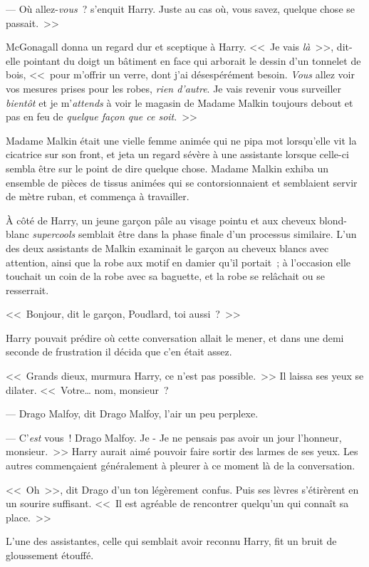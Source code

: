 --- Où allez-\emph{vous}~? s'enquit Harry. Juste au cas où, vous savez, quelque chose se passait.~>>

McGonagall donna un regard dur et sceptique à Harry. <<~Je vais \emph{là}~>>, dit-elle pointant du doigt un bâtiment en face qui arborait le dessin d'un tonnelet de bois, <<~pour m'offrir un verre, dont j'ai désespérément besoin. \emph{Vous} allez voir vos mesures prises pour les robes, \emph{rien d'autre}. Je vais revenir vous surveiller \emph{bientôt} et je m'\emph{attends} à voir le magasin de Madame Malkin toujours debout et pas en feu de \emph{quelque façon que ce soit}.~>>

Madame Malkin était une vielle femme animée qui ne pipa mot lorsqu'elle vit la cicatrice sur son front, et jeta un regard sévère à une assistante lorsque celle-ci sembla être sur le point de dire quelque chose. Madame Malkin exhiba un ensemble de pièces de tissus animées qui se contorsionnaient et semblaient servir de mètre ruban, et commença à travailler.

À côté de Harry, un jeune garçon pâle au visage pointu et aux cheveux blond-blanc \emph{supercools} semblait être dans la phase finale d'un processus similaire. L'un des deux assistants de Malkin examinait le garçon au cheveux blancs avec attention, ainsi que la robe aux motif en damier qu'il portait~; à l'occasion elle touchait un coin de la robe avec sa baguette, et la robe se relâchait ou se resserrait.

<<~Bonjour, dit le garçon, Poudlard, toi aussi~?~>>

Harry pouvait prédire où cette conversation allait le mener, et dans une demi seconde de frustration il décida que c'en était assez.

<<~Grands dieux, murmura Harry, ce n'est pas possible.~>> Il laissa ses yeux se dilater. <<~Votre… nom, monsieur~?

--- Drago Malfoy, dit Drago Malfoy, l'air un peu perplexe.

--- C'\emph{est} vous~! Drago Malfoy. Je - Je ne pensais pas avoir un jour l'honneur, monsieur.~>> Harry aurait aimé pouvoir faire sortir des larmes de ses yeux. Les autres commençaient généralement à pleurer à ce moment là de la conversation.

<<~Oh~>>, dit Drago d'un ton légèrement confus. Puis ses lèvres s'étirèrent en un sourire suffisant. <<~Il est agréable de rencontrer quelqu'un qui connaît sa place.~>>

L'une des assistantes, celle qui semblait avoir reconnu Harry, fit un bruit de gloussement étouffé.

